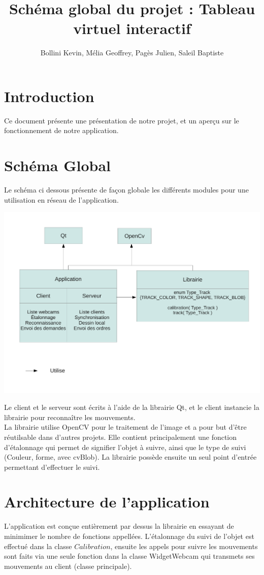 \documentclass{article}
\title{Schéma global du projet : Tableau virtuel interactif}
\author{Bollini Kevin, Mélia Geoffrey, Pagès Julien, Saleil Baptiste}
\begin{document}
\maketitle

\section{Introduction}
Ce document présente une présentation de notre projet, et un aperçu sur le fonctionnement de notre application.

\section{Schéma Global}
Le schéma ci dessous présente de façon globale les différents modules pour une utilisation en réseau de l'application.
	\begin{center}
	\includegraphics[scale=0.5]{schema_global.pdf}
	\end{center}
Le client et le serveur sont écrits à l'aide de la librairie Qt, et le client instancie la librairie pour reconnaître les mouvements. \\
La librairie utilise OpenCV pour le traitement de l'image et a pour but d'être réutilsable dans d'autres projets. 
Elle contient principalement une fonction d'étalonnage qui permet de signifier l'objet à suivre, ainsi que le type de suivi (Couleur, forme, avec cvBlob). La librairie possède ensuite un seul point d'entrée permettant d'effectuer le suivi.

\newpage
\section{Architecture de l'application}
L'application est conçue entièrement par dessus la librairie en essayant de minimimer le nombre de fonctions appellées. 
L'étalonnage du suivi de l'objet est effectué dans la classe $Calibration$, ensuite les appels pour suivre les mouvements sont faits
via une seule fonction dans la classe WidgetWebcam qui transmets ses mouvements au client (classe principale). \\
\end{document}
